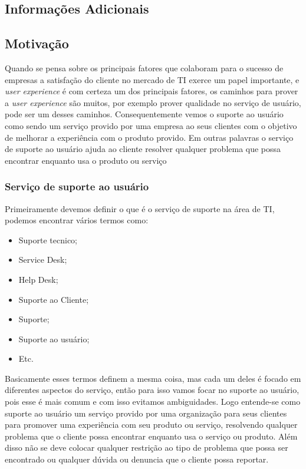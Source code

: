 \documentclass[11pt,a4paper]{article}
\begin{document}
\begin{flushleft}
\section{Informações Adicionais}

\subsection{Motivação}
Quando se pensa sobre os principais fatores que colaboram para o sucesso de
empresas a  satisfação do cliente no mercado de TI exerce um papel importante,
e \textit{user experience} é com certeza um dos principais fatores, os caminhos
para prover a \textit{user experience} são muitos, por exemplo prover qualidade
no serviço de usuário, pode ser um desses caminhos. Consequentemente vemos o
suporte ao usuário como sendo um serviço provido por uma empresa  ao seus
clientes com o objetivo de melhorar a experiência com o produto provido. Em
outras palavras o serviço de suporte ao usuário ajuda ao cliente resolver
qualquer problema que possa encontrar enquanto usa o produto ou serviço

\end{flushleft}

\subsubsection{Serviço de suporte ao usuário}
Primeiramente devemos definir o que é o serviço de suporte na área de TI,
podemos encontrar vários termos como:
\begin{itemize}[noitemsep]
  \item Suporte tecnico;
  \item Service Desk;
  \item Help Desk;
  \item Suporte ao Cliente;
  \item Suporte;
  \item Suporte ao usuário;
  \item Etc.
\end{itemize}

Basicamente esses termos definem a mesma coisa, mas cada um deles é focado
em diferentes aspectos do serviço, então para isso vamos focar no suporte
ao usuário, pois esse é mais comum e com isso evitamos ambiguidades.
Logo entende-se como suporte ao usuário um serviço provido por uma organização
para seus clientes para promover uma experiência com seu produto ou serviço,
resolvendo qualquer problema que o cliente possa encontrar enquanto usa o
serviço ou produto. Além disso não se  deve colocar qualquer restrição ao tipo
de problema que possa ser encontrado ou qualquer dúvida ou denuncia que o
cliente possa reportar.
\end{document}
